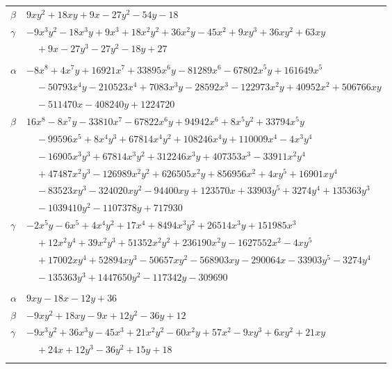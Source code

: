 \documentclass[11pt]{article}
\begin{document}
\begin{longtable}{@{}ll@{}}
$\beta$ & $9xy^{2}+18xy+9x-27y^{2}-54y-18$\\
$\gamma$ & $-9x^{3}y^{2}-18x^{3}y+9x^{3}+18x^{2}y^{2}+36x^{2}y-45x^{2}+9xy^{3}+36xy^{2}+63xy$\\
 & $\quad +9x-27y^{3}-27y^{2}-18y+27$\\
\addlinespace[3pt]
\multicolumn{2}{@{}l}{$\{i,j\}=\{123,128\}$, $k_{ij}=2^{4}\cdot 3^{8}\cdot 5\cdot 7$}\\
$\alpha$ & $-8x^{8}+4x^{7}y+16921x^{7}+33895x^{6}y-81289x^{6}-67802x^{5}y+161649x^{5}$\\
 & $\quad -50793x^{4}y-210523x^{4}+7083x^{3}y-28592x^{3}-122973x^{2}y+40952x^{2}+506766xy$\\
 & $\quad -511470x-408240y+1224720$\\
$\beta$ & $16x^{8}-8x^{7}y-33810x^{7}-67822x^{6}y+94942x^{6}+8x^{5}y^{2}+33794x^{5}y$\\
 & $\quad -99596x^{5}+8x^{4}y^{3}+67814x^{4}y^{2}+108246x^{4}y+110009x^{4}-4x^{3}y^{4}$\\
 & $\quad -16905x^{3}y^{3}+67814x^{3}y^{2}+312246x^{3}y+407353x^{3}-33911x^{2}y^{4}$\\
 & $\quad +47487x^{2}y^{3}-126989x^{2}y^{2}+626505x^{2}y+856956x^{2}+4xy^{5}+16901xy^{4}$\\
 & $\quad -83523xy^{3}-324020xy^{2}-94400xy+123570x+33903y^{5}+3274y^{4}+135363y^{3}$\\
 & $\quad -1039410y^{2}-1107378y+717930$\\
$\gamma$ & $-2x^{5}y-6x^{5}+4x^{4}y^{2}+17x^{4}+8494x^{3}y^{2}+26514x^{3}y+151985x^{3}$\\
 & $\quad +12x^{2}y^{4}+39x^{2}y^{3}+51352x^{2}y^{2}+236190x^{2}y-1627552x^{2}-4xy^{5}$\\
 & $\quad +17002xy^{4}+52894xy^{3}-50657xy^{2}-568903xy-290064x-33903y^{5}-3274y^{4}$\\
 & $\quad -135363y^{3}+1447650y^{2}-117342y-309690$\\
\addlinespace[3pt]
\multicolumn{2}{@{}l}{$\{i,j\}=\{123,129\}$, $k_{ij}=2^{2}\cdot 3^{3}$}\\
$\alpha$ & $9xy-18x-12y+36$\\
$\beta$ & $-9xy^{2}+18xy-9x+12y^{2}-36y+12$\\
$\gamma$ & $-9x^{3}y^{2}+36x^{3}y-45x^{3}+21x^{2}y^{2}-60x^{2}y+57x^{2}-9xy^{3}+6xy^{2}+21xy$\\
 & $\quad +24x+12y^{3}-36y^{2}+15y+18$\\
\addlinespace[3pt]
\multicolumn{2}{@{}l}{$\{i,j\}=\{123,157\}$, $k_{ij}=2^{5}\cdot 3^{3}\cdot 7$}\\

\end{longtable}
\end{document}
